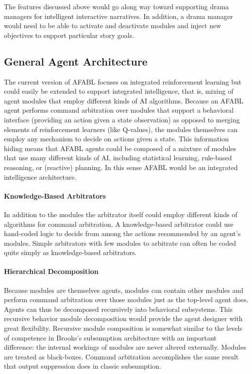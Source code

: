 The features discussed above would go along way toward supporting drama managers for intelligent interactive narratives. In addition, a drama manager would need to be able to activate and deactivate modules and inject new objectives to support particular story goals.

\subsection{General Agent Architecture}

The current version of AFABL focuses on integrated reinforcement learning but could easily be extended to support integrated intelligence, that is, mixing of agent modules that employ different kinds of AI algorithms. Because an AFABL agent performs command arbitration over modules that support a behavioral interface (providing an action given a state observation) as opposed to merging elements of reinforcement learners (like Q-values), the modules themselves can employ any mechanism to decide on actions given a state.  This information hiding means that AFABL agents could be composed of a mixture of modules that use many different kinds of AI, including statistical learning, rule-based reasoning, or (reactive) planning.  In this sense AFABL would be an integrated intelligence architecture.

\paragraph{Knowledge-Based Arbitrators}

In addition to the modules the arbitrator itself could employ different kinds of algorithms for command arbitration. A knowledge-based arbitrator could use hand-coded logic to decide from among the actions recommended by an agent's modules.  Simple arbitrators with few modules to arbitrate can often be coded quite simply as knowledge-based arbitrators.

\paragraph{Hierarchical Decomposition}

Because modules are themselves agents, modules can contain other modules and perform command arbitration over those modules just as the top-level agent does.  Agents can thus be decomposed recursively into behavioral subsystems.  This recursive behavior module decomposition would provide the agent designer with great flexibility.  Recursive module composition is somewhat similar to the levels of competence in Brooks's subsumption architecture with an important difference: the internal workings of modules are never altered externally.  Modules are treated as black-boxes.  Command arbitration accomplishes the same result that output suppression does in classic subsumption.

